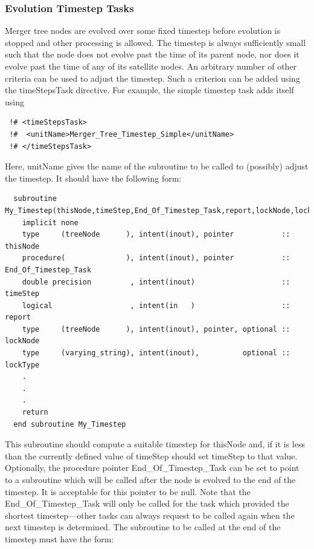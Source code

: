 \subsubsection{Evolution Timestep Tasks}

Merger tree nodes are evolved over some fixed timestep before evolution is stopped and other processing is allowed. The timestep is always sufficiently small such that the node does not evolve past the time of its parent node, nor does it evolve past the time of any of its satellite nodes. An arbitrary number of other criteria can be used to adjust the timestep. Such a criterion can be added using the {\normalfont \ttfamily timeStepsTask} directive. For example, the {\normalfont \ttfamily simple} timestep task adds itself using
\begin{verbatim}
 !# <timeStepsTask>
 !#  <unitName>Merger_Tree_Timestep_Simple</unitName>
 !# </timeStepsTask>
\end{verbatim}
Here, {\normalfont \ttfamily unitName} gives the name of the subroutine to be called to (possibly) adjust the timestep. It should have the following form:
\begin{verbatim}
  subroutine My_Timestep(thisNode,timeStep,End_Of_Timestep_Task,report,lockNode,lockType)
    implicit none
    type     (treeNode      ), intent(inout), pointer           :: thisNode
    procedure(              ), intent(inout), pointer           :: End_Of_Timestep_Task
    double precision         , intent(inout)                    :: timeStep
    logical                  , intent(in   )                    :: report
    type     (treeNode      ), intent(inout), pointer, optional :: lockNode
    type     (varying_string), intent(inout),          optional :: lockType
    .
    .
    .
    return
  end subroutine My_Timestep
\end{verbatim}
This subroutine should compute a suitable timestep for {\normalfont \ttfamily thisNode} and, if it is less than the currently defined value of {\normalfont \ttfamily timeStep} should set {\normalfont \ttfamily timeStep} to that value. Optionally, the procedure pointer {\normalfont \ttfamily End\_Of\_Timestep\_Task} can be set to point to a subroutine which will be called after the node is evolved to the end of the timestep. It is acceptable for this pointer to be null. Note that the {\normalfont \ttfamily End\_Of\_Timestep\_Task} will only be called for the task which provided the shortest timestep---other tasks can always request to be called again when the next timestep is determined. The subroutine to be called at the end of the timestep must have the form:
